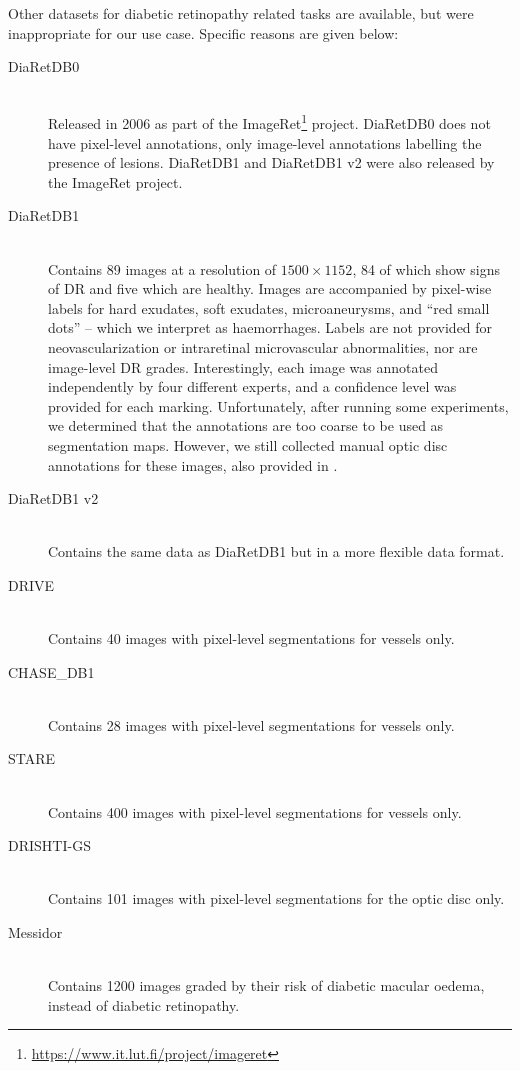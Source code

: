 Other datasets for diabetic retinopathy related tasks are available, but were inappropriate for our use case.
Specific reasons are given below:
\begin{description}
    \item[DiaRetDB0] \hfill \\ Released in 2006 as part of the ImageRet\footnote{\url{https://www.it.lut.fi/project/imageret}} project.
    DiaRetDB0 does not have pixel-level annotations, only image-level annotations labelling the presence of lesions.
    DiaRetDB1 and DiaRetDB1 v2 were also released by the ImageRet project.
    \item[DiaRetDB1] \hfill \\ Contains 89 images at a resolution of $1500\times 1152$, 84 of which show signs of DR and five which are healthy.
    Images are accompanied by pixel-wise labels for hard exudates, soft exudates, microaneurysms, and ``red small dots'' -- which we interpret as haemorrhages. 
    Labels are not provided for neovascularization or intraretinal microvascular abnormalities, nor are image-level DR grades.
    Interestingly, each image was annotated independently by four different experts, and a confidence level was provided for each marking.
    Unfortunately, after running some experiments, we determined that the annotations are too coarse to be used as segmentation maps.
    However, we still collected manual optic disc annotations for these images, also provided in .
    \item[DiaRetDB1 v2] \hfill \\ Contains the same data as DiaRetDB1 but in a more flexible data format.
    \item[DRIVE] \hfill \\ Contains 40 images with pixel-level segmentations for vessels only.
    \item[CHASE\_DB1] \hfill \\ Contains 28 images with pixel-level segmentations for vessels only.
    \item[STARE] \hfill \\ Contains 400 images with pixel-level segmentations for vessels only.
    \item[DRISHTI-GS] \hfill \\ Contains 101 images with pixel-level segmentations for the optic disc only.
    \item[Messidor] \hfill \\ Contains 1200 images graded by their risk of diabetic macular oedema, instead of diabetic retinopathy.
\end{description}


